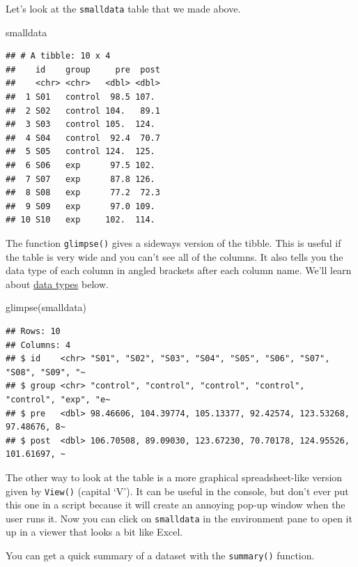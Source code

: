 \documentclass[
  oneside]{book}
\newenvironment{Shaded}{\begin{snugshade}}{\end{snugshade}}
\newcommand{\FunctionTok}[1]{\textcolor[rgb]{0.00,0.00,0.00}{#1}}
\newcommand{\NormalTok}[1]{#1}
\begin{document}
Let's look at the \texttt{smalldata} table that we made above.

\begin{Shaded}
\begin{Highlighting}[]
\NormalTok{smalldata}
\end{Highlighting}
\end{Shaded}

\begin{verbatim}
## # A tibble: 10 x 4
##    id    group     pre  post
##    <chr> <chr>   <dbl> <dbl>
##  1 S01   control  98.5 107. 
##  2 S02   control 104.   89.1
##  3 S03   control 105.  124. 
##  4 S04   control  92.4  70.7
##  5 S05   control 124.  125. 
##  6 S06   exp      97.5 102. 
##  7 S07   exp      87.8 126. 
##  8 S08   exp      77.2  72.3
##  9 S09   exp      97.0 109. 
## 10 S10   exp     102.  114.
\end{verbatim}

The function \texttt{glimpse()} gives a sideways version of the tibble. This is useful if the table is very wide and you can't see all of the columns. It also tells you the data type of each column in angled brackets after each column name. We'll learn about \protect\hyperlink{data_types}{data types} below.

\begin{Shaded}
\begin{Highlighting}[]
\FunctionTok{glimpse}\NormalTok{(smalldata)}
\end{Highlighting}
\end{Shaded}

\begin{verbatim}
## Rows: 10
## Columns: 4
## $ id    <chr> "S01", "S02", "S03", "S04", "S05", "S06", "S07", "S08", "S09", "~
## $ group <chr> "control", "control", "control", "control", "control", "exp", "e~
## $ pre   <dbl> 98.46606, 104.39774, 105.13377, 92.42574, 123.53268, 97.48676, 8~
## $ post  <dbl> 106.70508, 89.09030, 123.67230, 70.70178, 124.95526, 101.61697, ~
\end{verbatim}

The other way to look at the table is a more graphical spreadsheet-like version given by \texttt{View()} (capital `V'). It can be useful in the console, but don't ever put this one in a script because it will create an annoying pop-up window when the user runs it.
Now you can click on \texttt{smalldata} in the environment pane to open it up in a viewer that looks a bit like Excel.

You can get a quick summary of a dataset with the \texttt{summary()} function.
\end{document}
